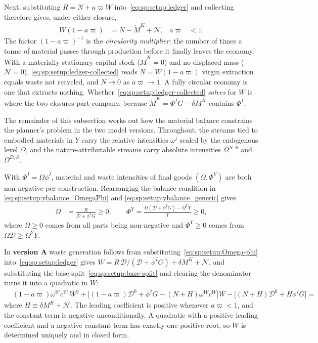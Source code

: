 Next, substituting $R=N+a\varpi W$ into~\eqref{eq:sp:setup:ledger} and collecting therefore gives, under either closure,
\begin{align}
W\left(1-a\varpi\right) &= N-\dot M^K+\mathcal N,
&
a\varpi&<1 .
\label{eq:sp:setup:ledger-collected}
\end{align}
The factor $\left(1-a\varpi\right)^{-1}$ is the \emph{circularity multiplier}: the number of times a tonne of material passes through production before it finally leaves the economy. With a materially stationary capital stock ($\dot M^K=0$) and no displaced mass ($\mathcal N=0$), \eqref{eq:sp:setup:ledger-collected} reads $N=W\left(1-a\varpi\right)$ virgin extraction equals waste not recycled, and $N\to0$ as $a\varpi\to1$. A fully circular economy is one that extracts nothing. Whether~\eqref{eq:sp:setup:ledger-collected} \emph{solves} for $W$ is where the two closures part company, because $\dot M^K=\Phi^IG-\delta M^K$ contains $\Phi^I$.



\bigskip
The remainder of this subsection works out how the material balance constrains the planner's problem in the two model versions. Throughout, the streams tied to embodied materials in $Y$ carry the relative intensities $\omega^j$ scaled by the endogenous level $\Omega$, and the nature-attributable streams carry absolute intensities $\Omega^{N,S}$ and $\Omega^{D,S}$.



With $\Phi^I = \Omega \phi^I$, material and waste intensities of final goods $(\Omega, \Phi^Y)$ are both non-negative per construction. Rearranging the balance condition in \eqref{eq:sp:setup:ybalance_OmegaPhi} and \eqref{eq:sp:setup:ybalance_generic} gives
\begin{align}
\Omega &= \frac{R}{\mathcal D+\phi^IG}\geq0, \qquad \Phi^Y = \frac{\Omega\left(\mathcal D + \phi^I G\right) - \Omega^Y Y}{Y}\geq0, 
\label{eq:sp:setup:Omega-phi}
\end{align}
where $\Omega\geq0$ comes from all parts being non-negative and $\Phi^Y\geq0$ comes from $\Omega \mathcal{D}\geq \Omega^Y Y$.


In \textbf{version A} waste generation follows from substituting~\eqref{eq:sp:setup:Omega-phi} into~\eqref{eq:sp:setup:ledger} gives $W=R\,\mathcal D/\left(\mathcal D+\phi^IG\right)+\delta M^K+\mathcal N$, and substituting the base split~\eqref{eq:sp:setup:base-split} and clearing the denominator turns it into a quadratic in $W$:
\begin{align}
&\left(1-a\varpi\right)\omega^Wc^W\,W^2
+\Big[\left(1-a\varpi\right)\mathcal D^0+\phi^IG-\left(N+H\right)\omega^Wc^W\Big]W
-\Big[\left(N+H\right)\mathcal D^0+H\phi^IG\Big] = \label{eq:sp:setup:ledger-quadratic}
\end{align}
where $H\equiv\delta M^K+\mathcal N$. The leading coefficient is positive whenever $a\varpi<1$, and the constant term is negative unconditionally. A quadratic with a positive leading coefficient and a negative constant term has exactly one positive root, so $W$ is determined uniquely and in closed form. 


